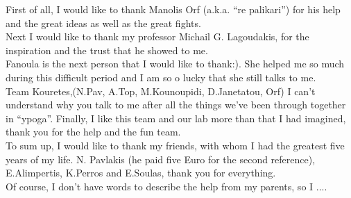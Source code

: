 First of all, I would like to thank Manolis Orf (a.k.a. ``re palikari'') for his help and the great ideas as well as the great fights. \\
Next I would like to thank my professor Michail G. Lagoudakis, for the inspiration and the trust that he showed to me.\\
Fanoula is the next person that I would like to thank:). She helped me so much during this difficult period and I am so o lucky that she still talks to me.\\
Team Kouretes,(N.Pav, A.Top, M.Kounoupidi, D.Janetatou, Orf) I can't understand why you talk to me after all the things we've been through together in ``ypoga''. Finally, I like this team and our lab more than that I had imagined, thank you for the help and the fun team.\\
To sum up, I would like to thank my friends, with whom I had the greatest five years of my life. N. Pavlakis (he paid five Euro for the second reference), E.Alimpertis, K.Perros and E.Soulas, thank you for everything.\\
Of course, I don't have words to describe the help from my parents, so I ....


